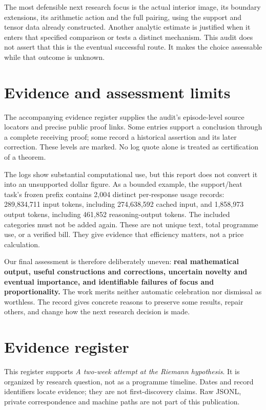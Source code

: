 \documentclass[
  british,
  11pt,
  a4paper,
]{article}
\begin{document}
The most defensible next research focus is the actual interior image,
its boundary extensions, its arithmetic action and the full pairing,
using the support and tensor data already constructed. Another analytic
estimate is justified when it enters that specified comparison or tests
a distinct mechanism. This audit does not assert that this is the
eventual successful route. It makes the choice assessable while that
outcome is unknown.

\section{Evidence and assessment
limits}\label{evidence-and-assessment-limits}

The accompanying evidence register supplies the audit's episode-level
source locators and precise public proof links. Some entries support a
conclusion through a complete receiving proof; some record a historical
assertion and its later correction. These levels are marked. No log
quote alone is treated as certification of a theorem.

The logs show substantial computational use, but this report does not
convert it into an unsupported dollar figure. As a bounded example, the
support/heat task's frozen prefix contains 2,004 distinct per-response
usage records: 289,834,711 input tokens, including 274,638,592 cached
input, and 1,858,973 output tokens, including 461,852 reasoning-output
tokens. The included categories must not be added again. These are not
unique text, total programme use, or a verified bill. They give evidence
that efficiency matters, not a price calculation.

Our final assessment is therefore deliberately uneven: \textbf{real
mathematical output, useful constructions and corrections, uncertain
novelty and eventual importance, and identifiable failures of focus and
proportionality.} The work merits neither automatic celebration nor
dismissal as worthless. The record gives concrete reasons to preserve
some results, repair others, and change how the next research decision
is made.

\clearpage

\section{Evidence register}\label{evidence-register}

This register supports \emph{A two-week attempt at the Riemann
hypothesis}. It is organized by research question, not as a programme
timeline. Dates and record identifiers locate evidence; they are not
first-discovery claims. Raw JSONL, private correspondence and machine
paths are not part of this publication.
\end{document}
